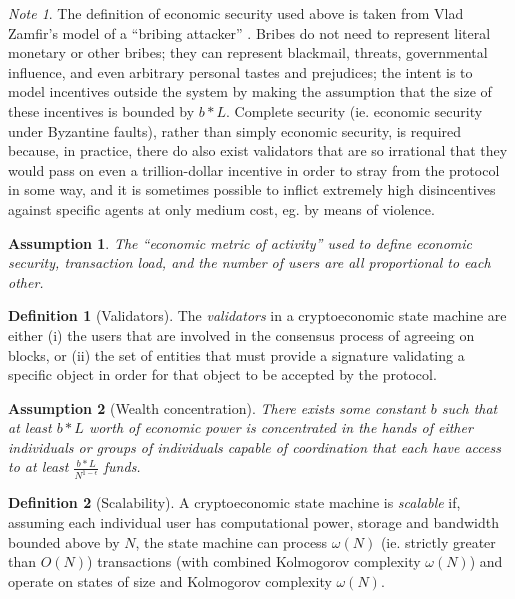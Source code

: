 \documentclass[11pt,a4paper]{report}
\theoremstyle{plain}
\newtheorem{assm}{Assumption}[chapter]
\theoremstyle{definition}
\newtheorem{defn}{Definition}[chapter]
\theoremstyle{remark}
\newtheorem*{note}{Note}
\begin{document}
\begin{note}
The definition of economic security used above is taken from Vlad Zamfir's model of a ``bribing attacker'' \cite{zamfir}. Bribes do not need to represent literal monetary or other bribes; they can represent blackmail, threats, governmental influence, and even arbitrary personal tastes and prejudices; the intent is to model incentives outside the system by making the assumption that the size of these incentives is bounded by $b * L$. Complete security (ie. economic security under Byzantine faults), rather than simply economic security, is required because, in practice, there do also exist validators that are so irrational that they would pass on even a trillion-dollar incentive in order to stray from the protocol in some way, and it is sometimes possible to inflict extremely high disincentives against specific agents at only medium cost, eg. by means of violence.
\end{note}

\begin{assm}
The ``economic metric of activity'' used to define economic security, transaction load, and the number of users are all proportional to each other.
\end{assm}

\begin{defn}[Validators]
The \emph{validators} in a cryptoeconomic state machine are either (i) the users that are involved in the consensus process of agreeing on blocks, or (ii) the set of entities that must provide a signature validating a specific object in order for that object to be accepted by the protocol.
\end{defn}

\begin{assm}[Wealth concentration]
There exists some constant $b$ such that at least $b * L$ worth of economic power is concentrated in the hands of either individuals or groups of individuals capable of coordination that each have access to at least $\frac{b * L}{N^{1-\epsilon}}$ funds.\cite{piketty}
\end{assm}

\begin{defn}[Scalability]
A cryptoeconomic state machine is \emph{scalable} if, assuming each individual user has computational power, storage and bandwidth bounded above by $N$, the state machine can process $\omega(N)$ (ie. strictly greater than $O(N)$) transactions (with combined Kolmogorov complexity $\omega(N)$) and operate on states of size and Kolmogorov complexity $\omega(N)$.
\end{defn}
\end{document}
